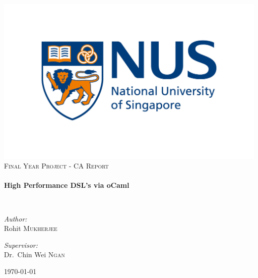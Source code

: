 \begin{titlepage}
\begin{center}

\includegraphics[width=1\textwidth]{figures/nus_logo.jpg}\\[1cm]

\textsc{\Large Final Year Project - CA Report}\\[0.5cm]

\HRule \\[0.4cm]
{ \huge \bfseries High Performance DSL's via oCaml \\[0.4cm] }

\HRule \\[1.5cm]

\noindent
\begin{minipage}{0.4\textwidth}
\begin{flushleft} \large
\emph{Author:}\\
Rohit \textsc{Mukherjee}
\end{flushleft}
\end{minipage}%
\begin{minipage}{0.4\textwidth}
\begin{flushright} \large
\emph{Supervisor:} \\
Dr.~Chin Wei \textsc{Ngan}
\end{flushright}
\end{minipage}

\vfill

{\large \today}

\end{center}
\end{titlepage}